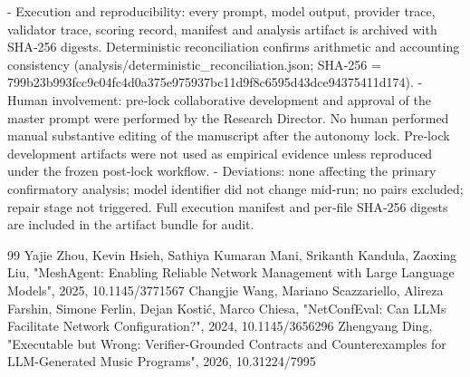 \documentclass[conference]{IEEEtran}
\begin{document}
- Execution and reproducibility: every prompt, model output, provider trace, validator trace, scoring record, manifest and analysis artifact is archived with SHA‑256 digests. Deterministic reconciliation confirms arithmetic and accounting consistency (analysis/deterministic\_reconciliation.json; SHA‑256 = 799b23b993fcc9c04fc4d0a375e975937bc11d9f8c6595d43dce94375411d174).
- Human involvement: pre‑lock collaborative development and approval of the master prompt were performed by the Research Director. No human performed manual substantive editing of the manuscript after the autonomy lock. Pre‑lock development artifacts were not used as empirical evidence unless reproduced under the frozen post‑lock workflow.
- Deviations: none affecting the primary confirmatory analysis; model identifier did not change mid‑run; no pairs excluded; repair stage not triggered. Full execution manifest and per‑file SHA‑256 digests are included in the artifact bundle for audit.

\begin{thebibliography}{99}
 Yajie Zhou, Kevin Hsieh, Sathiya Kumaran Mani, Srikanth Kandula, Zaoxing Liu, "MeshAgent: Enabling Reliable Network Management with Large Language Models", 2025, 10.1145/3771567
 Changjie Wang, Mariano Scazzariello, Alireza Farshin, Simone Ferlin, Dejan Kostić, Marco Chiesa, "NetConfEval: Can LLMs Facilitate Network Configuration?", 2024, 10.1145/3656296
 Zhengyang Ding, "Executable but Wrong: Verifier-Grounded Contracts and Counterexamples for LLM-Generated Music Programs", 2026, 10.31224/7995
\end{thebibliography}
\end{document}
